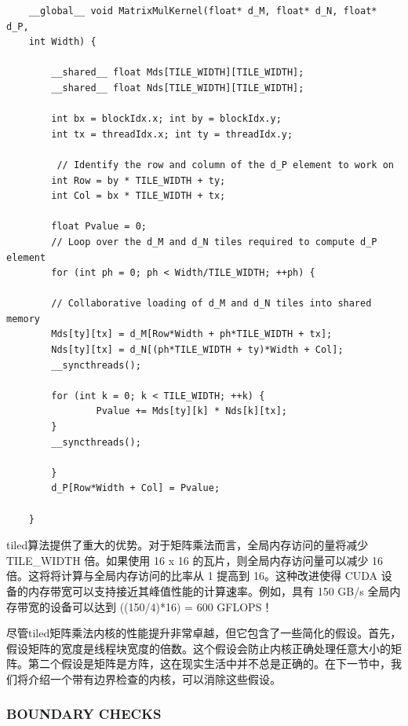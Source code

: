 \documentclass[11pt]{ctexart}
\begin{document}
\begin{lstlisting}
	__global__ void MatrixMulKernel(float* d_M, float* d_N, float* d_P,
	int Width) {
		
		__shared__ float Mds[TILE_WIDTH][TILE_WIDTH];
		__shared__ float Nds[TILE_WIDTH][TILE_WIDTH];
		
		int bx = blockIdx.x; int by = blockIdx.y;
		int tx = threadIdx.x; int ty = threadIdx.y;
		
		 // Identify the row and column of the d_P element to work on
		int Row = by * TILE_WIDTH + ty;
		int Col = bx * TILE_WIDTH + tx;
		
		float Pvalue = 0;
		// Loop over the d_M and d_N tiles required to compute d_P element
		for (int ph = 0; ph < Width/TILE_WIDTH; ++ph) {

		// Collaborative loading of d_M and d_N tiles into shared memory
		Mds[ty][tx] = d_M[Row*Width + ph*TILE_WIDTH + tx];
		Nds[ty][tx] = d_N[(ph*TILE_WIDTH + ty)*Width + Col];
		__syncthreads();

		for (int k = 0; k < TILE_WIDTH; ++k) {
				Pvalue += Mds[ty][k] * Nds[k][tx];
		}
		__syncthreads();

		}
		d_P[Row*Width + Col] = Pvalue;

	}
\end{lstlisting}

tiled算法提供了重大的优势。对于矩阵乘法而言，全局内存访问的量将减少 TILE\_WIDTH 倍。如果使用 16 x 16 的瓦片，则全局内存访问量可以减少 16 倍。这将将计算与全局内存访问的比率从 1 提高到 16。这种改进使得 CUDA 设备的内存带宽可以支持接近其峰值性能的计算速率。例如，具有 150 GB/s 全局内存带宽的设备可以达到 ((150/4)*16) = 600 GFLOPS！

尽管tiled矩阵乘法内核的性能提升非常卓越，但它包含了一些简化的假设。首先，假设矩阵的宽度是线程块宽度的倍数。这个假设会防止内核正确处理任意大小的矩阵。第二个假设是矩阵是方阵，这在现实生活中并不总是正确的。在下一节中，我们将介绍一个带有边界检查的内核，可以消除这些假设。

\subsubsection{BOUNDARY CHECKS}
\end{document}
